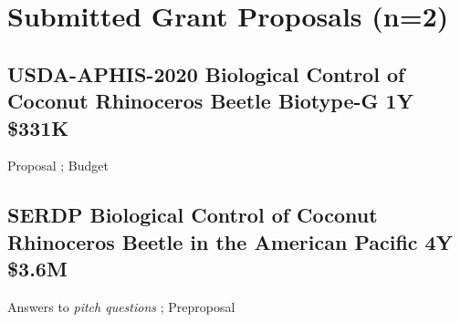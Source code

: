 \begin{comment}
\begin{tabular}{>{\raggedright}p{2in}>{\raggedright}p{2in}>{\centering}p{0.5in}>{\raggedleft}p{1in}}
\hline 
\textbf{Funding Source} & \textbf{Title} & \textbf{Years} & \textbf{Budget}\tabularnewline
\hline 
\textbf{Active} &  &  & \tabularnewline
\hline 
Farm Bill 2017 moore2017farmbill & Biological Control of Coconut Rhinoceros Beetle Biotype-G & 1 & \$200,000\tabularnewline
\hline 
Farm Bill 2018 moore2018farmbill & Biological Control of Coconut Rhinoceros Beetle Biotype-G & 1 & \$200,000\tabularnewline
\hline 
Department of the Interior - Office of Insular Affairs

moore2017doiproposal & Biological Control of Coconut Rhinoceros Beetle Biotype-G in Micronesia & 2 & \$176,553\tabularnewline
\hline 
McIntire-Stennis moore2018mcintirestennis2  & Guam Forest Insect Survey & 4 & \$40,000\tabularnewline
\hline 
National Plant Diagnostic Network 2017 moore2018university moore2018npdnaccomplishments &  & 1 & \$10,000\tabularnewline
\hline 
\textbf{Pending} &  &  & \tabularnewline
\hline 
Farm Bill 2019

\cite{moore_fy19_2018,moore_fy19_2018-1} & Biological Control of Coconut Rhinoceros Beetle Biotype-G & 1 & \$282,044\tabularnewline
\hline 
McIntire-Stennis moore2018mcintirestennis &  & 5 & \$80,000\tabularnewline
\hline 
National Plant Diagnostic Network &  & 1 & \$10,000\tabularnewline
\hline 
\end{tabular}
\end{comment}

\newpage
\section{Submitted Grant Proposals (n=2)}

\subsection{USDA-APHIS-2020 Biological Control of Coconut Rhinoceros Beetle Biotype-G 1Y \$331K}
\label{USDA-APHIS-2020}
\begin{refsection}
Proposal \cite{moore_fy20_2019};
Budget \cite{moore_fy20_2019-1} 
\printbibliography[heading=none]
\end{refsection}

\subsection{SERDP Biological Control of Coconut Rhinoceros Beetle in the American Pacific 4Y \$3.6M}
\label{SERDP}
\begin{refsection}
Answers to \textit{pitch questions} \cite{moore_aubreymoore/answers--pitch-questions_2019}; 
Preproposal \cite{moore_serdp_2020}	
\printbibliography[heading=none]
\end{refsection}


